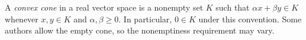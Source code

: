 
A \emph{convex cone} in a real vector space is a nonempty set $K$ such that $\alpha x+\beta y\in K$ whenever $x,y\in K$ and $\alpha,\beta\ge0$. In particular, $0\in K$ under this convention. Some authors allow the empty cone, so the nonemptiness requirement may vary.

